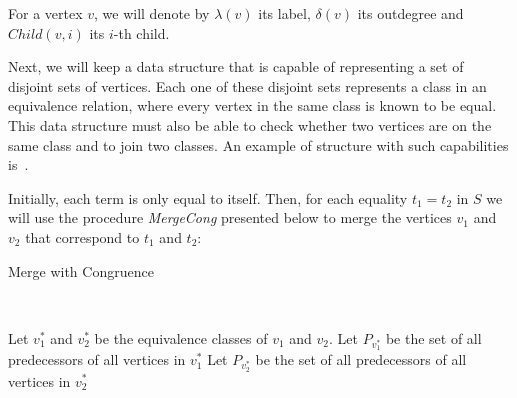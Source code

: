 \begin{figure}[h]
\centering
{}
\end{figure}

For a vertex $v$, we will denote by $\lambda(v)$ its label, $\delta(v)$ its outdegree and $Child(v, i)$ its $i$-th child.

Next, we will keep a data structure that is capable of representing a set of disjoint sets of vertices. Each one of these disjoint sets represents a class in an equivalence relation, where every vertex in the same class is known to be equal. This data structure must also be able to check whether two vertices are on the same class and to join two classes. An example of structure with such capabilities is~\cite{union_find}.

Initially, each term is only equal to itself. Then, for each equality $t_{1} = t_{2}$ in $S$ we will use the procedure \textit{MergeCong} presented below to merge the vertices $v_{1}$ and $v_{2}$ that correspond to $t_{1}$ and $t_{2}$:

\renewcommand{\algorithmicforall}{\textbf{for each}}
\MakeRobust{\Call}

\begin{algorithm}[H]
\caption{Merge with Congruence}~\label{merge_cong}
\begin{algorithmic}[1]
    \State\Return
  \EndIf
  \State Let $v_{1}^{*}$ and $v_{2}^{*}$ be the equivalence classes of $v_{1}$ and $v_{2}$.
  \State Let $P_{v_{1}^{*}}$ be the set of all predecessors of all vertices in $v_{1}^{*}$
  \State Let $P_{v_{2}^{*}}$ be the set of all predecessors of all vertices in $v_{2}^{*}$
  \State{}
      \State{}
    \EndIf
  \EndFor
  \EndFunction
\end{algorithmic}
\end{algorithm}

